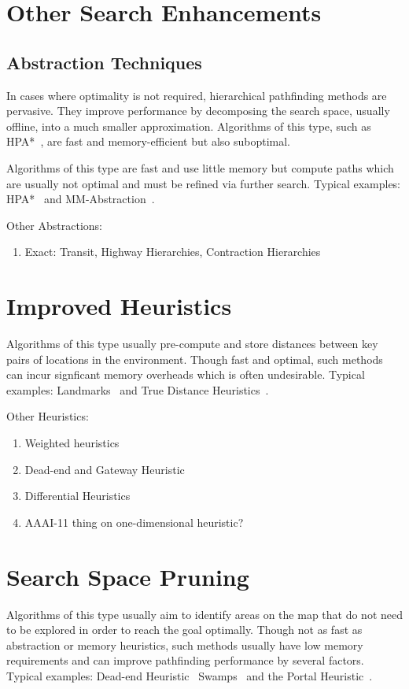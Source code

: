 \section{Other Search Enhancements}
\label{cha::lit::enhancements}

\subsection{Abstraction Techniques}
\label{cha::lit::enhancements::abstraction}
In cases where optimality is not required, hierarchical pathfinding methods
are pervasive.  They improve performance by decomposing the
search space, usually offline, into a much smaller approximation.  Algorithms
of this type, such as HPA*~\cite{botea04}, are  fast and
memory-efficient but also suboptimal.

Algorithms of this type are fast and use little memory but compute paths which are usually not
optimal and must be refined via further search. Typical examples: HPA*~\cite{botea04} and
MM-Abstraction~\cite{sturtevant07}.

Other Abstractions:
\begin{enumerate}
\item{Exact: Transit, Highway Hierarchies, Contraction Hierarchies}
\end{enumerate}

\section{Improved Heuristics}
\label{cha::lit::enhancements::heuristics}
Algorithms of this type usually pre-compute and store distances between key pairs of locations
in the environment. Though fast and optimal, such methods can incur signficant
memory overheads which is often undesirable. Typical examples: Landmarks~\cite{goldberg05} and
True Distance Heuristics~\cite{sturtevant09}.

Other Heuristics:
\begin{enumerate}
\item{Weighted heuristics}
\item{Dead-end and Gateway Heuristic}
\item{Differential Heuristics}
\item{AAAI-11 thing on one-dimensional heuristic?}
\end{enumerate}

\section{Search Space Pruning}
\label{cha::lit::enhancements::pruning}
Algorithms of this type usually aim to identify areas on the map that do not need to be explored in
order to reach the goal optimally. Though not as fast as abstraction or memory
heuristics, such methods usually have low memory requirements and can improve
pathfinding performance by several factors. Typical examples: Dead-end Heuristic~\cite{bjornsson06}
Swamps~\cite{pochter09} and the Portal Heuristic~\cite{goldenberg10}.

